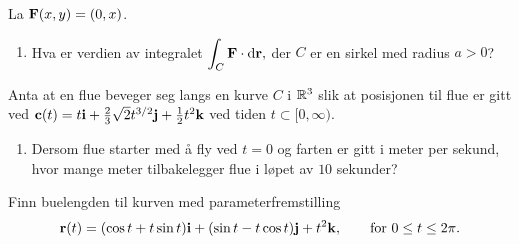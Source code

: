 

\oppgave[K2016, Oppgave 5] La $\mathbf{F}(x, y) = (0, x)$.

\begin{enumerate}
  \item Hva er verdien av integralet
    $ \displaystyle
      \int_C \vek{F} \cdot \dd\vek{r},
    $
    der $C$ er en sirkel med radius $a>0$?
\end{enumerate}

\oppgave[V2016, Oppgave 2] Anta at en flue beveger seg langs en kurve $C$ i
$\mathbb{R}^3$ slik at posisjonen til flue er gitt ved $\mathbf{c}(t) = t \mathbf{i} +
\frac{2}{3}\sqrt{2} t^{3/2} \mathbf{j} + \frac{1}{2}t^2 \mathbf{k}$ ved tiden $t
\subset [0, \infty)$.
    
\begin{enumerate}
  \item Dersom flue starter med å fly ved $t = 0$ og farten er gitt i meter per
    sekund, hvor mange meter tilbakelegger flue i løpet av $10$ sekunder?
\end{enumerate}

\oppgave[K2015, Oppgave 2] Finn buelengden til kurven med parameterfremstilling
%
\begin{equation*}
  \mathbf{r}(t) = (\cos t + t \sin t)\mathbf{i} + (\sin t - t \cos t)\mathbf{j} + t^2 \mathbf{k}, \qquad \text{for} \ 0 \leq t \leq 2\pi.
\end{equation*}

